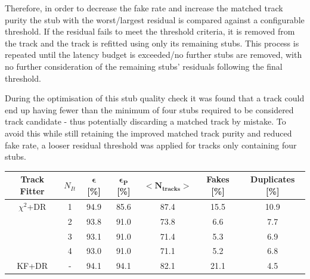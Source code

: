 Therefore, in order to decrease the fake rate and increase the matched track purity the stub with the worst/largest residual is compared against a configurable threshold.
If the residual fails to meet the threshold criteria, it is removed from the track and the track is refitted using only its remaining stubs.
This process is repeated until the latency budget is exceeded/no further stubs are removed, with no further consideration of the remaining stubs' residuals following the final threshold.

During the optimisation of this stub quality check it was found that a track could end up having fewer than the minimum of four stubs required to be considered track candidate - thus potentially discarding a matched track by mistake.
To avoid this while still retaining the improved matched track purity and reduced fake rate, a looser residual threshold was applied for tracks only containing four stubs.

\begin{table}[htbp]
\label{tab:chi2_iterations}
  \centering
 \begin{tabular}{ccccccc}
   \hline
   \bf{Track Fitter} & $N_{It}$ & \bf{$\bm{\epsilon}$ [\%]} & \bf{$\bm{\epsilon_{P}}$ [\%]} & $\bm{<N_{tracks}>}$ & \bf{Fakes [\%]} & \bf{Duplicates [\%]}  \\
   \hline
   $\chi^{2}$+DR & 1 & 94.9 & 85.6 & 87.4 & 15.5 & 10.9 \\  
   & 2 & 93.8 & 91.0 & 73.8 & 6.6 & 7.7 \\
   & 3 & 93.1 & 91.0 & 71.4 & 5.3 & 6.9 \\
   & 4 & 93.0 & 91.0 & 71.1 & 5.2 & 6.8 \\
   \hline
   KF+DR & - & 94.1 & 94.1 & 82.1 & 21.1 & 4.5 \\
   \hline
   
 \end{tabular}%
\end{table}

